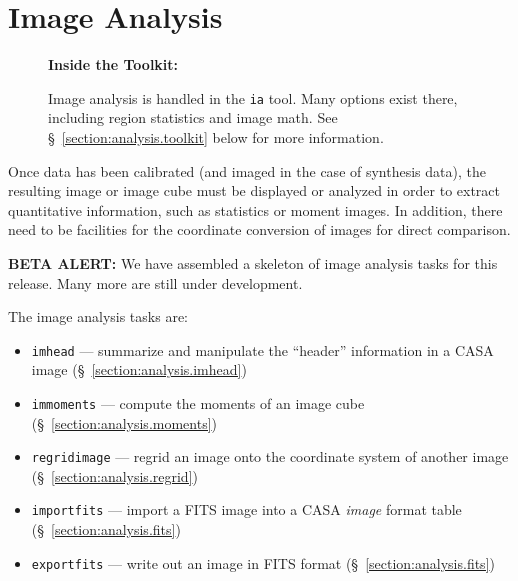 

\chapter{Image Analysis}
\label{chapter:analysis}

\begin{wrapfigure}{r}{2.5in}
  \begin{boxedminipage}{2.5in}
     \centerline{\bf Inside the Toolkit:}
     Image analysis is handled in the {\tt ia} tool.
     Many options exist there, including region statistics and
     image math. See \S~\ref{section:analysis.toolkit} below
     for more information.
  \end{boxedminipage}
\end{wrapfigure}

Once data has been calibrated (and imaged in the case of synthesis
data), the resulting image or image cube must be displayed or 
analyzed in order to extract quantitative information, such as
statistics or moment images.  In addition, there need to be facilities for
the coordinate conversion of images for direct comparison.

{\bf BETA ALERT:} We have assembled a skeleton of image analysis tasks for
this release.  Many more are still under development.

The image analysis tasks are:
\begin{itemize}
   \item {\tt imhead} --- summarize and manipulate the ``header'' 
         information in a CASA image 
         (\S~\ref{section:analysis.imhead})
   \item {\tt immoments} --- compute the moments of an image cube
         (\S~\ref{section:analysis.moments})
   \item {\tt regridimage} --- regrid an image onto the coordinate
         system of another image 
         (\S~\ref{section:analysis.regrid})
   \item {\tt importfits} --- import a FITS image into a CASA  
         {\it image} format table 
         (\S~\ref{section:analysis.fits})
   \item {\tt exportfits} --- write out an image in FITS format
         (\S~\ref{section:analysis.fits})
\end{itemize}

